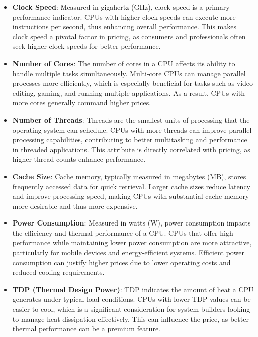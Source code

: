 \begin{itemize}
    \item \textbf{Clock Speed}: Measured in gigahertz (GHz), clock speed is a primary performance indicator. CPUs with higher clock speeds can execute more instructions per second, thus enhancing overall performance. This makes clock speed a pivotal factor in pricing, as consumers and professionals often seek higher clock speeds for better performance.
    
    \item \textbf{Number of Cores}: The number of cores in a CPU affects its ability to handle multiple tasks simultaneously. Multi-core CPUs can manage parallel processes more efficiently, which is especially beneficial for tasks such as video editing, gaming, and running multiple applications. As a result, CPUs with more cores generally command higher prices.
    
    \item \textbf{Number of Threads}: Threads are the smallest units of processing that the operating system can schedule. CPUs with more threads can improve parallel processing capabilities, contributing to better multitasking and performance in threaded applications. This attribute is directly correlated with pricing, as higher thread counts enhance performance.
    
    \item \textbf{Cache Size}: Cache memory, typically measured in megabytes (MB), stores frequently accessed data for quick retrieval. Larger cache sizes reduce latency and improve processing speed, making CPUs with substantial cache memory more desirable and thus more expensive.
    
    \item \textbf{Power Consumption}: Measured in watts (W), power consumption impacts the efficiency and thermal performance of a CPU. CPUs that offer high performance while maintaining lower power consumption are more attractive, particularly for mobile devices and energy-efficient systems. Efficient power consumption can justify higher prices due to lower operating costs and reduced cooling requirements.
    
    \item \textbf{TDP (Thermal Design Power)}: TDP indicates the amount of heat a CPU generates under typical load conditions. CPUs with lower TDP values can be easier to cool, which is a significant consideration for system builders looking to manage heat dissipation effectively. This can influence the price, as better thermal performance can be a premium feature.
    

\end{itemize}
